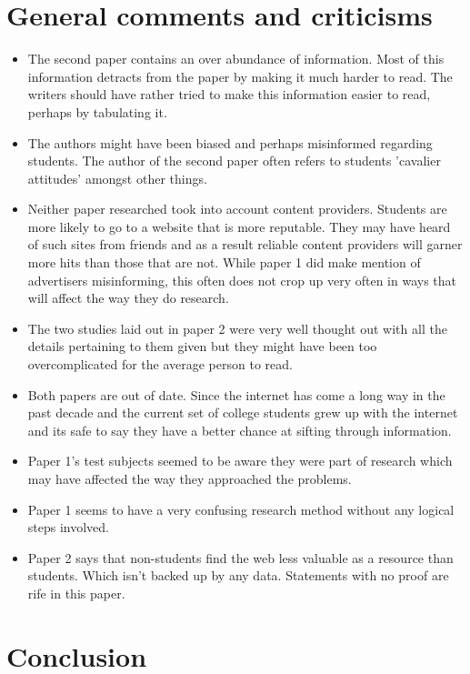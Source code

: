 \documentclass[11pt]{article}
\begin{document}
\clearpage
\section{General comments and criticisms}
\begin{itemize}
\item The second paper \citep{metzger2003college} contains an over abundance of information. Most of this information detracts from the paper by making it much harder to read. The writers should have rather tried to make this information easier to read, perhaps by tabulating it. 
\item  The authors might have been biased and perhaps misinformed regarding students. The author of the second paper often refers to students 'cavalier attitudes' \citep[page. 274]{metzger2003college} amongst other things.
\item Neither paper researched took into account content providers. Students are more likely to go to a website that is more reputable. They may have heard of such sites from friends and as a result reliable content providers will garner more hits than those that are not. While paper 1 did make mention of advertisers misinforming, this often does not crop up very often in ways that will affect the way they do research.
\item The two studies laid out in paper 2 were very well thought out with all the details pertaining to them given but they might have been too overcomplicated for the average person to read.
\item Both papers are out of date. Since the internet has come a long way in the past decade and the current set of college students grew up with the internet and its safe to say they have a better chance at sifting through information.
\item Paper 1's test subjects seemed to be aware they were part of research which may have affected the way they approached the problems.
\item Paper 1 seems to have a very confusing research method without any logical steps involved.
\item Paper 2 says that non-students find the web less valuable as a resource than students. Which isn't backed up by any data. Statements with no proof are rife in this paper.
\end{itemize}


\clearpage
\section{Conclusion} 
\end{document}
